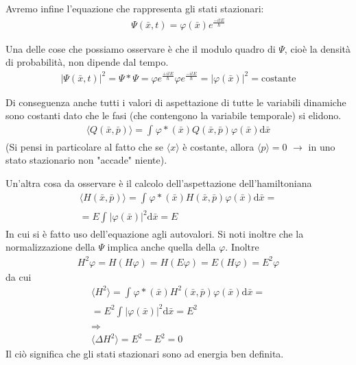 Avremo infine l'equazione che rappresenta gli stati stazionari:
\begin{equation}\begin{split}
\Psi\left(\bar x,t\right)=\varphi\left(\bar x\right)e^{\frac{-itE}{\hbar}}
\end{split}\end{equation}

Una delle cose che possiamo osservare è che il modulo quadro di $\Psi$, cioè la densità di probabilità, non dipende dal tempo.
\begin{equation}\begin{split}
|\Psi\left(\bar x,t\right)|^2=\Psi*\Psi=\varphi e^{\frac{+itE}{\hbar}}\varphi e^{\frac{-itE}{\hbar}}=|\varphi\left(\bar x\right)|^2=\textrm{costante}
\end{split}\end{equation}

Di conseguenza anche tutti i valori di aspettazione di tutte le variabili dinamiche sono costanti dato che le fasi (che contengono la variabile temporale) si elidono.
\begin{equation}\begin{split}
\langle Q\left(\bar x,\bar p\right)\rangle=\int_{}^{}{\varphi*\left(\bar x\right) Q\left(\bar x,\bar p \right)\varphi\left(\bar x\right)\textrm{d}\bar x}
\end{split}\end{equation}
(Si pensi in particolare al fatto che se $\langle x\rangle$ è costante, allora $\langle p\rangle =0$ $\rightarrow$ in uno stato stazionario non "accade" niente).

Un'altra cosa da osservare è il calcolo dell'aspettazione dell'hamiltoniana
\begin{equation}\begin{split}
\langle H\left(\bar x,\bar p\right)\rangle=\int_{}^{}{\varphi*\left(\bar x\right)H\left(\bar x,\bar p\right)\varphi\left(\bar x\right)\textrm{d}\bar x}=\\
=E\int_{}^{}{|\varphi\left(\bar x\right)|^2\textrm{d}\bar x}=E
\end{split}\end{equation}
In cui si è fatto uso dell'equazione agli autovalori.
Si noti inoltre che la normalizzazione della $\Psi$ implica anche quella della $\varphi$.
Inoltre 
\begin{equation}\begin{split}
H^2\varphi=H(H\varphi)=H(E\varphi)=E(H\varphi)=E^2\varphi
\end{split}\end{equation}
da cui 
\begin{equation}\begin{split}
\langle H^2 \rangle=\int_{}^{}{\varphi*\left(\bar x\right)H^2\left(\bar x,\bar p\right)\varphi\left(\bar x\right)\textrm{d}\bar x}=\\
=E^2\int_{}^{}{|\varphi\left(\bar x\right)|^2\textrm{d}\bar x}=E^2\\
\Longrightarrow \\
\langle \Delta H^2 \rangle =E^2-E^2=0
\end{split}\end{equation}
Il ciò significa che gli stati stazionari sono ad energia ben definita.

